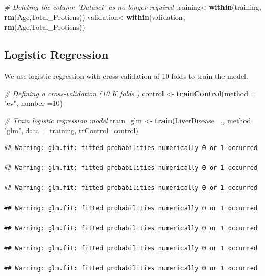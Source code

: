 \documentclass[]{article}
\newenvironment{Shaded}{\begin{snugshade}}{\end{snugshade}}
\newcommand{\CommentTok}[1]{\textcolor[rgb]{0.56,0.35,0.01}{\textit{#1}}}
\newcommand{\DataTypeTok}[1]{\textcolor[rgb]{0.13,0.29,0.53}{#1}}
\newcommand{\DecValTok}[1]{\textcolor[rgb]{0.00,0.00,0.81}{#1}}
\newcommand{\KeywordTok}[1]{\textcolor[rgb]{0.13,0.29,0.53}{\textbf{#1}}}
\newcommand{\NormalTok}[1]{#1}
\newcommand{\OperatorTok}[1]{\textcolor[rgb]{0.81,0.36,0.00}{\textbf{#1}}}
\newcommand{\StringTok}[1]{\textcolor[rgb]{0.31,0.60,0.02}{#1}}
\begin{document}
\begin{Shaded}
\begin{Highlighting}[]
\CommentTok{# Deleting the column 'Dataset' as no longer required}
\NormalTok{training<-}\KeywordTok{within}\NormalTok{(training, }\KeywordTok{rm}\NormalTok{(Age,Total_Protiens))}
\NormalTok{validation<-}\KeywordTok{within}\NormalTok{(validation, }\KeywordTok{rm}\NormalTok{(Age,Total_Protiens))}
\end{Highlighting}
\end{Shaded}

\subsection{Logistic Regression}

We use logistic regression with cross-validation of 10 folds to train
the model.

\begin{Shaded}
\begin{Highlighting}[]
\CommentTok{# Defining a cross-validation (10 K folds )}
\NormalTok{control <-}\StringTok{ }\KeywordTok{trainControl}\NormalTok{(}\DataTypeTok{method =} \StringTok{"cv"}\NormalTok{, }\DataTypeTok{number =}\DecValTok{10}\NormalTok{)}

\CommentTok{# Train logistic regression model}
\NormalTok{train_glm <-}\StringTok{ }\KeywordTok{train}\NormalTok{(LiverDisease }\OperatorTok{~}\NormalTok{., }
                   \DataTypeTok{method =} \StringTok{"glm"}\NormalTok{,}
                   \DataTypeTok{data =}\NormalTok{ training,}
                   \DataTypeTok{trControl=}\NormalTok{control)}
\end{Highlighting}
\end{Shaded}

\begin{verbatim}
## Warning: glm.fit: fitted probabilities numerically 0 or 1 occurred

## Warning: glm.fit: fitted probabilities numerically 0 or 1 occurred

## Warning: glm.fit: fitted probabilities numerically 0 or 1 occurred

## Warning: glm.fit: fitted probabilities numerically 0 or 1 occurred

## Warning: glm.fit: fitted probabilities numerically 0 or 1 occurred

## Warning: glm.fit: fitted probabilities numerically 0 or 1 occurred

## Warning: glm.fit: fitted probabilities numerically 0 or 1 occurred
\end{verbatim}
\end{document}
